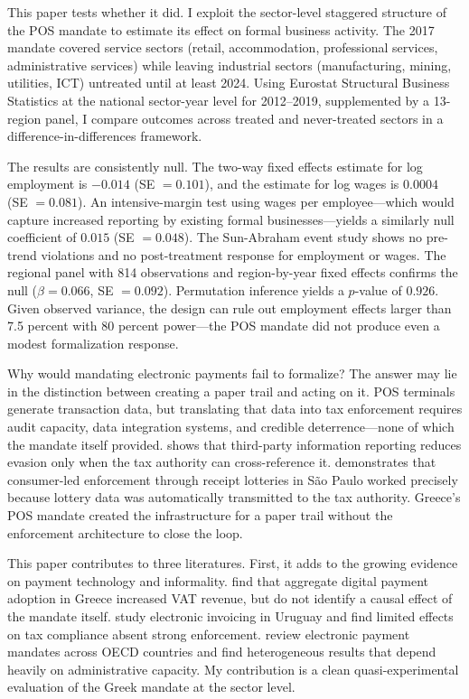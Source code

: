 \documentclass[12pt]{article}
\begin{document}
This paper tests whether it did. I exploit the sector-level staggered structure of the POS mandate to estimate its effect on formal business activity. The 2017 mandate covered service sectors (retail, accommodation, professional services, administrative services) while leaving industrial sectors (manufacturing, mining, utilities, ICT) untreated until at least 2024. Using Eurostat Structural Business Statistics at the national sector-year level for 2012--2019, supplemented by a 13-region panel, I compare outcomes across treated and never-treated sectors in a difference-in-differences framework.

The results are consistently null. The two-way fixed effects estimate for log employment is $-0.014$ (SE $= 0.101$), and the estimate for log wages is $0.0004$ (SE $= 0.081$). An intensive-margin test using wages per employee---which would capture increased reporting by existing formal businesses---yields a similarly null coefficient of $0.015$ (SE $= 0.048$). The Sun-Abraham event study shows no pre-trend violations and no post-treatment response for employment or wages. The regional panel with 814 observations and region-by-year fixed effects confirms the null ($\beta = 0.066$, SE $= 0.092$). Permutation inference yields a $p$-value of $0.926$. Given observed variance, the design can rule out employment effects larger than 7.5 percent with 80 percent power---the POS mandate did not produce even a modest formalization response.

Why would mandating electronic payments fail to formalize? The answer may lie in the distinction between creating a paper trail and acting on it. POS terminals generate transaction data, but translating that data into tax enforcement requires audit capacity, data integration systems, and credible deterrence---none of which the mandate itself provided. \citet{pomeranz2015no} shows that third-party information reporting reduces evasion only when the tax authority can cross-reference it. \citet{naritomi2019consumers} demonstrates that consumer-led enforcement through receipt lotteries in S\~ao Paulo worked precisely because lottery data was automatically transmitted to the tax authority. Greece's POS mandate created the infrastructure for a paper trail without the enforcement architecture to close the loop.

This paper contributes to three literatures. First, it adds to the growing evidence on payment technology and informality. \citet{hondroyiannis2020fiscal} find that aggregate digital payment adoption in Greece increased VAT revenue, but do not identify a causal effect of the mandate itself. \citet{bergolo2022tax} study electronic invoicing in Uruguay and find limited effects on tax compliance absent strong enforcement. \citet{fantozzi2023electronic} review electronic payment mandates across OECD countries and find heterogeneous results that depend heavily on administrative capacity. My contribution is a clean quasi-experimental evaluation of the Greek mandate at the sector level.
\end{document}
